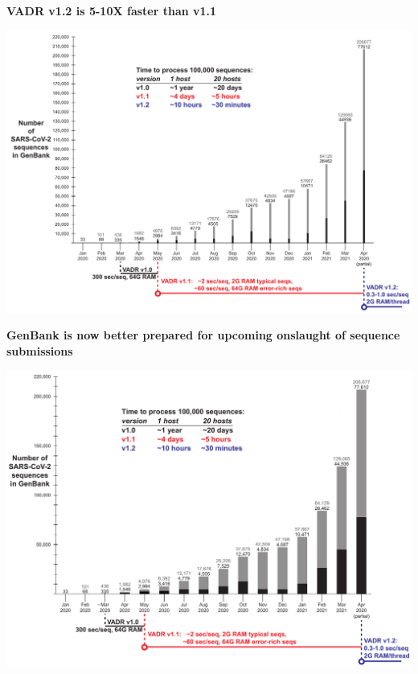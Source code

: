 \documentclass[landscape]{slides}
\begin{document}
\begin{slide}
\begin{center}
\Large{\textbf{VADR v1.2 is 5-10X faster than v1.1}}

\includegraphics[width=10.5in]{figs/sars-counts-jan2020-apr2021-slide2}
\end{center}

\vfill
\end{slide}
\begin{slide}
\begin{center}
\Large{\textbf{GenBank is now better prepared for upcoming onslaught of sequence submissions}}

\includegraphics[width=10.5in]{figs/sars-counts-jan2020-apr2021-slide3}
\end{center}

\vfill
\end{slide}
\end{document}
